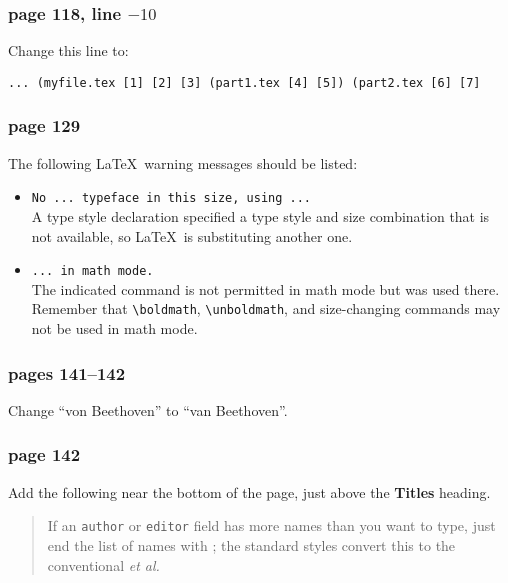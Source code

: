\subsubsection*{page 118, line $-10$}

Change this line to:
\begin{small}
\begin{verbatim}
... (myfile.tex [1] [2] [3] (part1.tex [4] [5]) (part2.tex [6] [7]
\end{verbatim}
\end{small}

\subsubsection*{page 129}

The following \LaTeX\ warning messages should be listed:
\begin{itemize}
\item[] {\tt No ... typeface in this size, using ...}\\
A type style declaration specified a type style and size combination
that is not available, so \LaTeX\ is substituting another one.

\item[] {\tt ... in math mode.}\\
The indicated command is not permitted in math mode but was used there.
Remember that \verb|\boldmath|, \verb|\unboldmath|, and size-changing
commands may not be used in math mode.
\end{itemize}


\subsubsection*{pages 141--142}

Change ``von Beethoven'' to ``van Beethoven''.


\subsubsection*{page 142}

Add the following near the bottom of the page, just above the
{\bf Titles} heading.
\begin{quote}
If an {\tt author} or {\tt editor} field has more names than you want to
type, just end the list of names with ; the standard styles convert this to the conventional {\em et
al.}
\end{quote}

